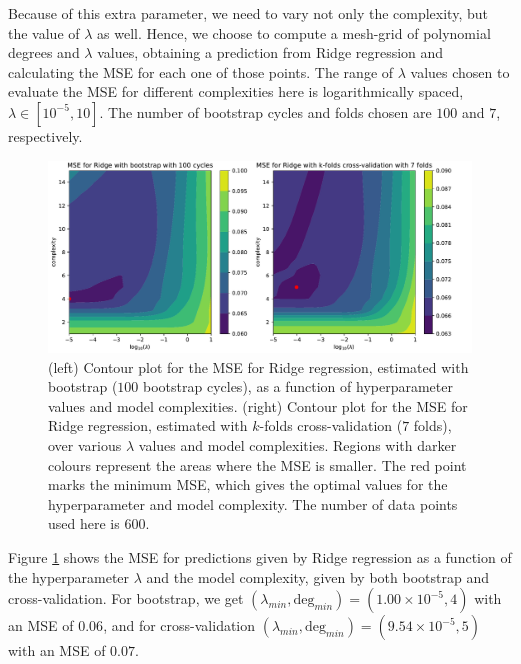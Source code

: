 \documentclass[10pt, a4paper]{article}
\begin{document}
    Because of this extra parameter, we need to vary not only the complexity, but the value of $\lambda$ as well. Hence, we choose to compute a mesh-grid of polynomial degrees and $\lambda$ values, obtaining a prediction from Ridge regression and calculating the MSE for each one of those points. The range of $\lambda$ values chosen to evaluate the MSE for different complexities here is logarithmically spaced, $\lambda \in [10^{-5}, 10]$. The number of bootstrap cycles and folds chosen are $100$ and $7$, respectively.
    
    \begin{figure}[h]
        \centering
        \includegraphics[scale=0.55]{ex4_bs_bcs_100_cv_k_folds_7_n_lmd_50_n_600_noise_0.25.pdf}
        \caption{(left) Contour plot for the MSE for Ridge regression, estimated with bootstrap ($100$ bootstrap cycles), as a function of hyper\-parameter values and model complexities. (right) Contour plot for the MSE for Ridge regression, estimated with $k$-folds cross-validation ($7$ folds), over various $\lambda$ values and model complexities. Regions with darker colours represent the areas where the MSE is smaller. The red point marks the minimum MSE, which gives the optimal values for the hyperparameter and model complexity. The number of data points used here is $600$.}
        \label{fig:ex4}
    \end{figure}
    
    Figure \ref{fig:ex4} shows the MSE for predictions given by Ridge regression as a function of the hyperparameter $\lambda$ and the model complexity, given by both bootstrap and cross-validation. For bootstrap, we get $(\lambda_{min}, \text{deg}_{min}) = (1.00 \times 10^{-5}, 4)$ with an MSE of $0.06$, and for cross-validation $(\lambda_{min}, \text{deg}_{min}) = (9.54 \times 10^{-5}, 5)$ with an MSE of $0.07$. 
    
\end{document}
